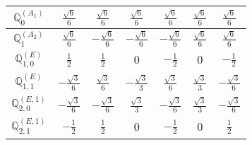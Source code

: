 \documentclass[fleqn,10pt,landscape]{article}
\begin{document}
\begin{itemize}
{\begin{center}
\begin{longtable}{ccccccc}
$\mathbb{Q}_{0}^{(A_{1})}$ & $ \frac{\sqrt{6}}{6} $ & $ \frac{\sqrt{6}}{6} $ & $ \frac{\sqrt{6}}{6} $ & $ \frac{\sqrt{6}}{6} $ & $ \frac{\sqrt{6}}{6} $ & $ \frac{\sqrt{6}}{6} $ \\ \hline
$\mathbb{Q}_{1}^{(A_{2})}$ & $ \frac{\sqrt{6}}{6} $ & $ - \frac{\sqrt{6}}{6} $ & $ - \frac{\sqrt{6}}{6} $ & $ - \frac{\sqrt{6}}{6} $ & $ \frac{\sqrt{6}}{6} $ & $ \frac{\sqrt{6}}{6} $ \\ \hline
$\mathbb{Q}_{1,0}^{(E)}$ & $ \frac{1}{2} $ & $ \frac{1}{2} $ & $ 0 $ & $ - \frac{1}{2} $ & $ 0 $ & $ - \frac{1}{2} $ \\ \hline
$\mathbb{Q}_{1,1}^{(E)}$ & $ - \frac{\sqrt{3}}{6} $ & $ \frac{\sqrt{3}}{6} $ & $ - \frac{\sqrt{3}}{3} $ & $ \frac{\sqrt{3}}{6} $ & $ \frac{\sqrt{3}}{3} $ & $ - \frac{\sqrt{3}}{6} $ \\ \hline
$\mathbb{Q}_{2,0}^{(E,1)}$ & $ - \frac{\sqrt{3}}{6} $ & $ - \frac{\sqrt{3}}{6} $ & $ \frac{\sqrt{3}}{3} $ & $ - \frac{\sqrt{3}}{6} $ & $ \frac{\sqrt{3}}{3} $ & $ - \frac{\sqrt{3}}{6} $ \\ \hline
$\mathbb{Q}_{2,1}^{(E,1)}$ & $ - \frac{1}{2} $ & $ \frac{1}{2} $ & $ 0 $ & $ - \frac{1}{2} $ & $ 0 $ & $ \frac{1}{2} $ \\
\end{longtable}
\end{center}
}
\end{itemize}
\end{document}
